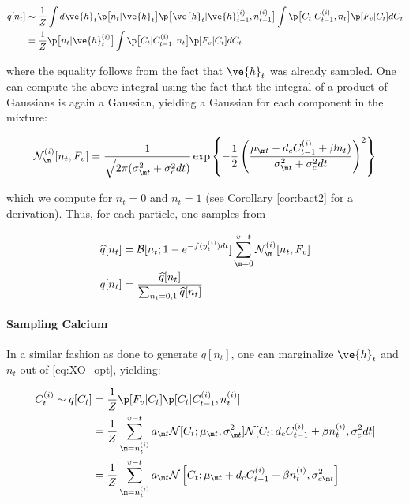 \begin{align}
\nonumber q[n_t] &\sim \frac{1}{Z} \int d\ve{h}_t  \p \big[ n_t | \ve{h}_t \big] \p \big[ \ve{h}_t | \ve{h}^{(i)}_{t-1}, n_{t-1}^{(i)} \big] \int  \p \big[ C_t | C^{(i)}_{t-1}, n_t \big] \p[F_v|C_t] dC_t
\\&=\frac{1}{Z} \p \big[ n_t | \ve{h}^{(i)}_t \big] \int \p \big[ C_t | C^{(i)}_{t-1}, n_t \big] \p[F_v | C_t] dC_t
\end{align}

\noindent where the equality follows from the fact that $\ve{h}_t$ was already sampled. One can compute the above integral using the fact that the integral of a product of Gaussians is again a Gaussian, yielding a Gaussian for each component in the mixture:

\begin{align} \label{aeq:Z_t}
\mathcal{N}_{\m}^{(i)}[n_t, F_v] =
\frac{1}{\sqrt{2 \pi (\sigma_{\m t}^2 + \sigma_c^2 dt)}} \exp \left\{-\frac{1}{2}\left(\frac{\mu_{\m t}-d_c C_{t-1}^{(i)} + \beta n_t)} {\sigma_{\m t}^2 + \sigma_c^2 dt}\right)^2\right\}
\end{align}


\noindent which we compute for $n_t=0$ and $n_t=1$ (see Corollary \ref{cor:bact2}  for a derivation).  Thus, for each particle, one samples from

\begin{align} \label{aeq:qn}
\widehat{q}[n_t]&=\mathcal{B}[n_t; 1-e^{-f(y_t^{(i)}) dt}] \sum_{\m=0}^{v-t} \mathcal{N}_{\m}^{(i)}[n_t, F_v]\\
q[n_t]&=\frac{\widehat{q}[n_t]}{\sum_{n_t=0,1} \widehat{q}[n_t]}
\end{align}

\paragraph{Sampling Calcium}

In a similar fashion as done to generate $q[n_t]$, one can marginalize $\ve{h}_t$ and \emph{$n_t$} out of \eqref{eq:XO_opt}, yielding:

\begin{equation} \label{aeq:qC}
\begin{split}
C_t^{(i)} \sim q[C_t] &= \frac{1}{Z}  \p[F_v | C_t] \p[C_t | C_{t-1}^{(i)}, n_t^{(i)}]
\\&= \frac{1}{Z}  \sum_{\m=n_t^{(i)}}^{v-t} a_{\m t} \mathcal{N}[C_t; \mu_{\m t}, \sigma_{\m t}^2] \mathcal{N}[C_t; d_c C_{t-1}^{(i)} + \beta n_t^{(i)}, \sigma_c^2 dt]
\\ &= \frac{1}{Z}  \sum_{\m=n_t^{(i)}}^{v-t} a_{\m t} \mathcal{N}\left[C_t; \mu_{\m t} + d_c C_{t-1}^{(i)} + \beta n_t^{(i)}, \sigma_{c\m t}^2 \right]
\end{split}
\end{equation}

